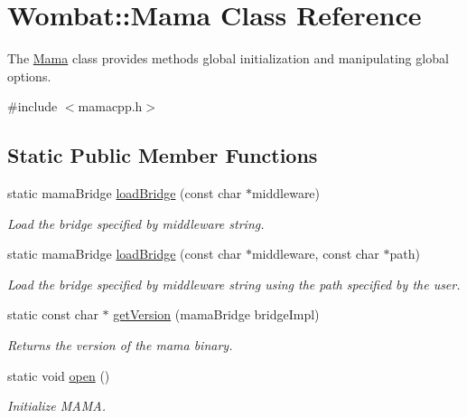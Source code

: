 \hypertarget{classWombat_1_1Mama}{
\section{Wombat::Mama Class Reference}
\label{classWombat_1_1Mama}
}


The {\ttfamily \hyperlink{classWombat_1_1Mama}{Mama}} class provides methods global initialization and manipulating global options.  


{\ttfamily \#include $<$mamacpp.h$>$}\subsection*{Static Public Member Functions}
\begin{DoxyCompactItemize}
\item 
static mamaBridge \hyperlink{classWombat_1_1Mama_a57bc9e0cf0931ccf84de55aaaf926f8d}{loadBridge} (const char $\ast$middleware)
\begin{DoxyCompactList}\small\item\em Load the bridge specified by middleware string. \item\end{DoxyCompactList}\item 
static mamaBridge \hyperlink{classWombat_1_1Mama_aa1a335543d17ecdfa3ef77a63920e6b8}{loadBridge} (const char $\ast$middleware, const char $\ast$path)
\begin{DoxyCompactList}\small\item\em Load the bridge specified by middleware string using the path specified by the user. \item\end{DoxyCompactList}\item 
static const char $\ast$ \hyperlink{classWombat_1_1Mama_a8f05e65f0ad4f8ea2ebe522539762f04}{getVersion} (mamaBridge bridgeImpl)
\begin{DoxyCompactList}\small\item\em Returns the version of the mama binary. \item\end{DoxyCompactList}\item 
static void \hyperlink{classWombat_1_1Mama_af1fafa88e6e22e7afc37b10de0f5a0d5}{open} ()
\begin{DoxyCompactList}\small\item\em Initialize MAMA. \item\end{DoxyCompactList}\item 

\end{DoxyCompactItemize}
